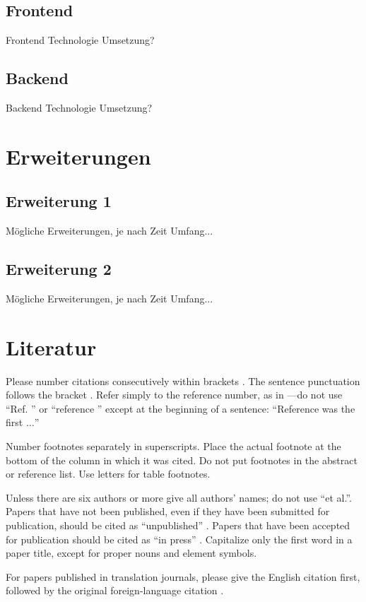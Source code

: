 \documentclass[conference]{IEEEtran}
\begin{document}
\subsection{Frontend}
Frontend Technologie
Umsetzung?

\subsection{Backend}
Backend Technologie
Umsetzung?

\section{Erweiterungen}
\subsection{Erweiterung 1}
Mögliche Erweiterungen, je nach Zeit Umfang...

\subsection{Erweiterung 2}
Mögliche Erweiterungen, je nach Zeit Umfang...

\section*{Literatur}

Please number citations consecutively within brackets \cite{b1}. The 
sentence punctuation follows the bracket \cite{b2}. Refer simply to the reference 
number, as in \cite{b3}---do not use ``Ref. \cite{b3}'' or ``reference \cite{b3}'' except at 
the beginning of a sentence: ``Reference \cite{b3} was the first $\ldots$''

Number footnotes separately in superscripts. Place the actual footnote at 
the bottom of the column in which it was cited. Do not put footnotes in the 
abstract or reference list. Use letters for table footnotes.

Unless there are six authors or more give all authors' names; do not use 
``et al.''. Papers that have not been published, even if they have been 
submitted for publication, should be cited as ``unpublished'' \cite{b4}. Papers 
that have been accepted for publication should be cited as ``in press'' \cite{b5}. 
Capitalize only the first word in a paper title, except for proper nouns and 
element symbols.

For papers published in translation journals, please give the English 
citation first, followed by the original foreign-language citation \cite{b6}.
\end{document}
